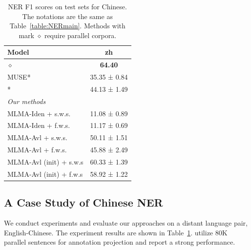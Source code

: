 \documentclass[11pt,a4paper]{article}
\begin{document}
	\begin{table}[t]
		\centering
		\begin{tabular}{l c} 
			Model  & zh \\
			\hline
			\newcite{wang14cross}$\diamond$ & \textbf{64.40} \\
			MUSE* & 35.35 ± 0.84 \\
			\newcite{xie2018neural}* & 44.13 ± 1.49 \\
			\hline
			\textit{Our methods} & \\
			MLMA-Iden + s.w.s. & 11.08 ± 0.89 \\
			MLMA-Iden + f.w.s. & 11.17 ± 0.69 \\
			MLMA-Avl + s.w.s. & 50.11 ± 1.51 \\
			MLMA-Avl + f.w.s. & 45.88 ± 2.49 \\
			MLMA-Avl (init) + s.w.s & 60.33 ± 1.39 \\
			MLMA-Avl (init) + f.w.s & 58.92 ± 1.22 \\
			\hline
		\end{tabular}
		\caption{ NER F1 scores on test sets for Chinese. The notations are the same as Table~\ref{table:NERmain}. Methods with mark $\diamond$ require parallel corpora.}
		\vspace{-1em}
		\label{table:NERchs}
	\end{table}
	
	

	\subsection{A Case Study of Chinese NER}
	We conduct experiments and evaluate our approaches on a distant language pair, English-Chinese. The experiment results are shown in Table~\ref{table:NERchs}.  utilize 80K parallel sentences for annotation projection and report a strong performance.
	
\end{document}
